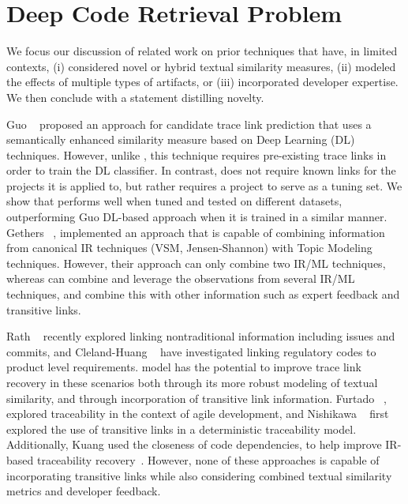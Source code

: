 \section{Deep Code Retrieval Problem}
\label{sec:deep-retrieval-problem}


We focus our discussion of related work on prior techniques that have, in limited contexts, (i) considered novel or hybrid textual similarity measures, (ii) modeled the effects of multiple types of artifacts, or (iii) incorporated developer expertise. We then conclude with a statement distilling \Comets novelty.

 Guo \etal~\cite{Guo:ICSE'17} proposed an approach for candidate trace link prediction that uses a semantically enhanced similarity measure based on Deep Learning (DL) techniques. However, unlike \Comet, this technique requires pre-existing trace links in order to train the DL classifier.  In contrast, \Comet does not require known links for the projects it is applied to, but rather requires a project to serve as a tuning set. We show that \Comet performs well when tuned and tested on different datasets, outperforming Guo \etals DL-based approach when it is trained in a similar manner. Gethers \etal~\citep{Gethers:ICSM'11}, implemented an approach that is capable of combining information from canonical IR techniques (\ie VSM, Jensen-Shannon) with Topic Modeling techniques. However, their approach can only combine two IR/ML techniques, whereas \Comet can combine and leverage the observations from several IR/ML techniques, and combine this with other information such as expert feedback and transitive links. 

 Rath \etal~\citep{Rath:ICSE'18} recently explored linking nontraditional information including issues and commits, and Cleland-Huang \etal~\citep{Cleland-Huang:ICSE'10} have investigated linking regulatory codes to product level requirements.  \Comets model has the potential to improve trace link recovery in these scenarios both through its more robust modeling of textual similarity, and through incorporation of transitive link information. Furtado \etal~\cite{Furtado:RE'16}, explored traceability in the context of agile development, and Nishikawa \etal~\citep{Nishikawa:ICSME'15} first explored the use of transitive links in a deterministic traceability model. Additionally, Kuang \etal used the closeness of code dependencies, to help improve IR-based traceability recovery~\citep{Kuang:SANER'17}. However, none of these approaches is capable of incorporating transitive links while also considering combined textual similarity metrics and developer feedback.

